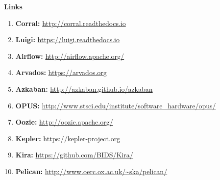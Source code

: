 \documentclass[final,5p,times,twocolumn,authoryear]{elsarticle}
\begin{document}
\label{fig:tabla}

\newpage
\raggedright
\textbf{Links}

{ \renewcommand\labelenumi{[\theenumi]}
\begin{enumerate}
\item \textbf{Corral:} \url{http://corral.readthedocs.io}
\item \textbf{Luigi:} \url{https://luigi.readthedocs.io}
\item \textbf{Airflow:} \url{http://airflow.apache.org/}
\item \textbf{Arvados:} \url{https://arvados.org}
\item \textbf{Azkaban:} \url{http://azkaban.github.io/azkaban}
\item \textbf{OPUS:} \url{http://www.stsci.edu/institute/software_hardware/opus/}
\item \textbf{Oozie:} \url{http://oozie.apache.org/}
\item \textbf{Kepler:} \url{https://kepler-project.org}
\item \textbf{Kira:} \url{https://github.com/BIDS/Kira/}
\item \textbf{Pelican:} \url{http://www.oerc.ox.ac.uk/~ska/pelican/}
\end{enumerate}
}
\end{document}
